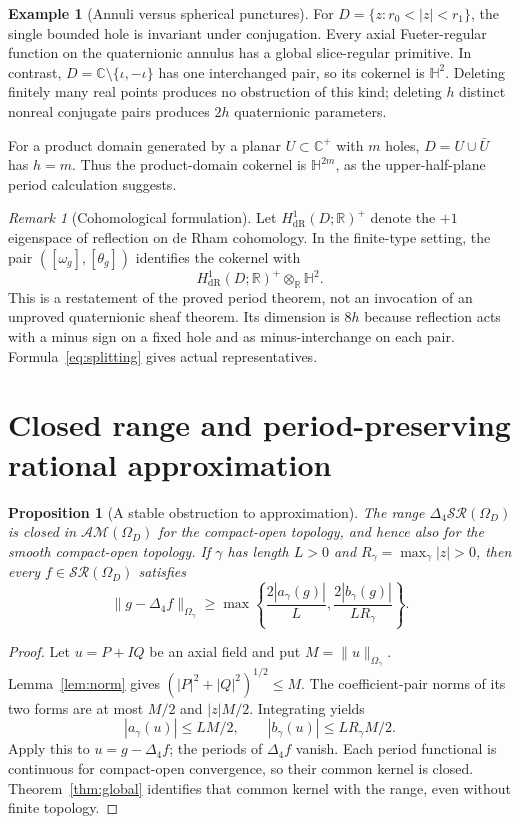 \documentclass[11pt,a4paper]{article}
\numberwithin{equation}{section}
\newtheorem{proposition}[theorem]{Proposition}
\theoremstyle{definition}
\newtheorem{example}[theorem]{Example}
\theoremstyle{remark}
\newtheorem{remark}[theorem]{Remark}
\newcommand{\R}{\mathbb R}
\newcommand{\C}{\mathbb C}
\newcommand{\HH}{\mathbb H}
\newcommand{\SR}{\mathcal{SR}}
\newcommand{\AM}{\mathcal{AM}}
\newcommand{\lap}{\Delta_4}
\begin{document}
\begin{example}[Annuli versus spherical punctures]
For $D=\{z:r_0<|z|<r_1\}$, the single bounded hole is invariant under
conjugation. Every axial Fueter-regular function on the quaternionic
annulus has a global slice-regular primitive. In contrast,
$D=\C\setminus\{\iota,-\iota\}$ has one interchanged pair, so its
cokernel is $\HH^2$. Deleting finitely many real points produces no
obstruction of this kind; deleting $h$ distinct nonreal conjugate pairs
produces $2h$ quaternionic parameters.

For a product domain generated by a planar $U\subset\C^+$ with $m$
holes, $D=U\cup\bar U$ has $h=m$. Thus the product-domain cokernel is
$\HH^{2m}$, as the upper-half-plane period calculation suggests.
\end{example}

\begin{remark}[Cohomological formulation]
Let $H^1_{\mathrm{dR}}(D;\R)^+$ denote the $+1$ eigenspace of reflection
on de Rham cohomology. In the finite-type setting, the pair
$([\omega_g],[\theta_g])$ identifies the cokernel with
\[
 H^1_{\mathrm{dR}}(D;\R)^+\otimes_\R\HH^2.
\]
This is a restatement of the proved period theorem, not an invocation of
an unproved quaternionic sheaf theorem. Its dimension is $8h$ because
reflection acts with a minus sign on a fixed hole and as minus-interchange
on each pair. Formula~\eqref{eq:splitting} gives actual representatives.
\end{remark}

\section{Closed range and period-preserving rational approximation}
\label{sec:approx}
\begin{proposition}[A stable obstruction to approximation]
\label{prop:closedrange}
The range $\lap\SR(\Omega_D)$ is closed in $\AM(\Omega_D)$ for the
compact-open topology, and hence also for the smooth compact-open
topology. If $\gamma$ has length $L>0$ and
$R_\gamma=\max_\gamma|z|>0$, then every $f\in\SR(\Omega_D)$ satisfies
\begin{equation}
 \|g-\lap f\|_{\Omega_\gamma}
 \geq\max\left\{\frac{2|a_\gamma(g)|}{L},
           \frac{2|b_\gamma(g)|}{LR_\gamma}\right\}.
 \label{eq:nondensity}
\end{equation}
\end{proposition}
\begin{proof}
Let $u=P+I Q$ be an axial field and put
$M=\|u\|_{\Omega_\gamma}$. Lemma~\ref{lem:norm} gives
$(|P|^2+|Q|^2)^{1/2}\leq M$. The coefficient-pair norms of its two
forms are at most $M/2$ and $|z|M/2$. Integrating yields
\[
 |a_\gamma(u)|\leq LM/2,\qquad
 |b_\gamma(u)|\leq LR_\gamma M/2.
\]
Apply this to $u=g-\lap f$; the periods of $\lap f$ vanish. Each period
functional is continuous for compact-open convergence, so their common
kernel is closed. Theorem~\ref{thm:global} identifies that common kernel
with the range, even without finite topology.
\end{proof}
\end{document}
